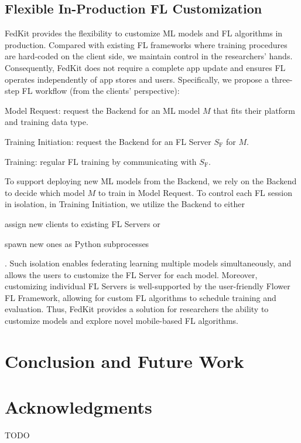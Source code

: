 \documentclass[letterpaper]{article} %
\begin{document}
\subsection{Flexible In-Production FL Customization}
\newcommand{\model}{$M$}
\newcommand{\fs}{$S_\mathrm F$}
FedKit provides the flexibility to customize ML models and FL algorithms
in production.
Compared with existing FL frameworks where training procedures are hard-coded on the client side, 
we maintain control in the researchers' hands.
Consequently, FedKit does not require a complete app update and ensures FL operates independently of app stores and users.
Specifically, we propose a three-step FL workflow (from the clients' perspective):
\begin{enumerate*}[label=\arabic*.]
    \item Model Request: request the Backend for an ML model \model{} that fits
        their platform and training data type.
    \item Training Initiation: request the Backend for an FL Server \fs{}
        for \model.
    \item Training: regular FL training by communicating with \fs.
\end{enumerate*}


To support deploying new ML models from the Backend,
we rely on the Backend to decide which model \model{} to train in Model Request.
To control each FL session in isolation, in Training Initiation,
we utilize the Backend to either
\begin{enumerate*}[label=\arabic*)]
    \item assign new clients to existing FL Servers or
    \item spawn new ones as Python subprocesses
\end{enumerate*}.
Such isolation enables federating learning multiple models simultaneously, and
allows the users to customize the FL Server for each model.
Moreover, customizing individual FL Servers is well-supported by the user-friendly Flower FL Framework, 
allowing for custom FL algorithms to schedule training and evaluation.
Thus, FedKit provides a solution for researchers the ability to
customize models and explore novel mobile-based FL algorithms.



\section{Conclusion and Future Work}


\appendix

\section*{Acknowledgments}
TODO

\bigskip


\end{document}
